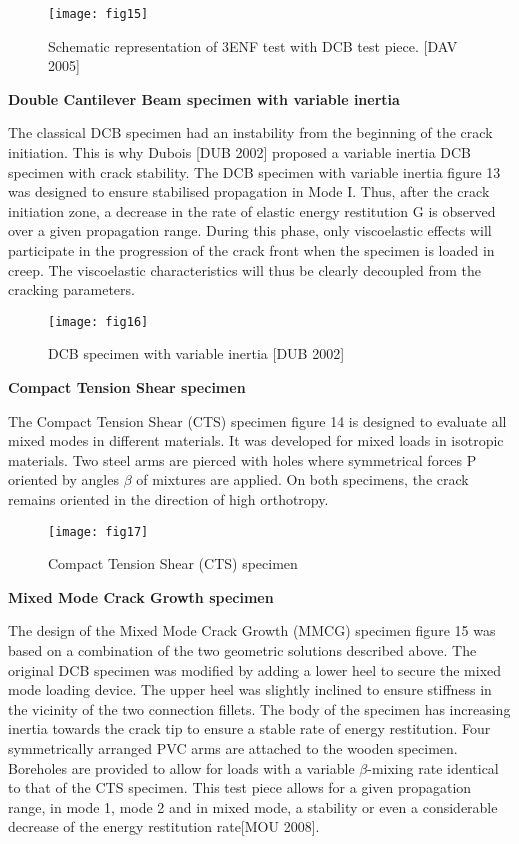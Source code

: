 \graphicspath{{Images/}}
\begin{figure}[htp]
	\centering
	\texttt{[image: fig15]}
	\caption{Schematic representation of 3ENF test with DCB test piece. [DAV 2005]}
	\label{fig:galaxy}
\end{figure}

\smallskip

\textbf{Double Cantilever Beam specimen with variable inertia}

The classical DCB specimen had an instability from the beginning of the crack initiation. This is why Dubois [DUB 2002] proposed a variable inertia DCB specimen with crack stability. The DCB specimen with variable inertia figure 13 was designed to ensure stabilised propagation in Mode I. Thus, after the crack initiation zone, a decrease in the rate of elastic energy restitution G is observed over a given propagation range. During this phase, only viscoelastic effects will participate in the progression of the crack front when the specimen is loaded in creep. The viscoelastic characteristics will thus be clearly decoupled from the cracking parameters. 

\graphicspath{{Images/}}
\begin{figure}[htp]
	\centering
	\texttt{[image: fig16]}
	\caption{DCB specimen with variable inertia [DUB 2002]}
	\label{fig:galaxy}
\end{figure}

\smallskip

\textbf{Compact Tension Shear specimen}

The Compact Tension Shear (CTS) specimen figure 14 is designed to evaluate all mixed modes in different materials. It was developed for mixed loads in isotropic materials. Two steel arms are pierced with holes where symmetrical forces P oriented by angles $\beta$ of mixtures are applied. On both specimens, the crack remains oriented in the direction of high orthotropy.

\graphicspath{{Images/}}
\begin{figure}[htp]
	\centering
	\texttt{[image: fig17]}
	\caption{Compact Tension Shear (CTS) specimen}
	\label{fig:galaxy}
\end{figure}

\newpage

\textbf{Mixed Mode Crack Growth specimen}

The design of the Mixed Mode Crack Growth (MMCG) specimen figure 15 was based on a combination of the two geometric solutions described above. The original DCB specimen was modified by adding a lower heel to secure the mixed mode loading device. The upper heel was slightly inclined to ensure stiffness in the vicinity of the two connection fillets. The body of the specimen has increasing inertia towards the crack tip to ensure a stable rate of energy restitution. Four symmetrically arranged PVC arms are attached to the wooden specimen. Boreholes are provided to allow for loads with a variable $\beta$-mixing rate identical to that of the CTS specimen. This test piece allows for a given propagation range, in mode 1, mode 2 and in mixed mode, a stability or even a considerable decrease of the energy restitution rate[MOU 2008].

